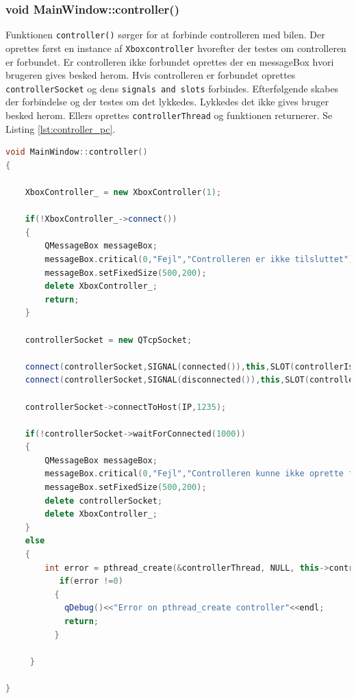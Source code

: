 \subsubsection{void MainWindow::controller()}
Funktionen \texttt{controller()} sørger for at forbinde controlleren med bilen. Der oprettes først en instance af \texttt{Xboxcontroller} hvorefter der testes om controlleren er forbundet. Er controlleren ikke forbundet oprettes der en messageBox hvori brugeren gives besked herom. Hvis controlleren er forbundet oprettes \texttt{controllerSocket} og dens \texttt{signals and slots} forbindes. Efterfølgende skabes der forbindelse og der testes om det lykkedes. Lykkedes det ikke gives bruger besked herom. Ellers oprettes \texttt{controllerThread} og funktionen returnerer. Se Listing \ref{lst:controller_pc}.
\begin{lstlisting}[caption={controller},label=lst:controller_pc, language=c++]
void MainWindow::controller()
{

    XboxController_ = new XboxController(1);

    if(!XboxController_->connect())
    {
        QMessageBox messageBox;
        messageBox.critical(0,"Fejl","Controlleren er ikke tilsluttet");
        messageBox.setFixedSize(500,200);
        delete XboxController_;
        return;
    }

    controllerSocket = new QTcpSocket;

    connect(controllerSocket,SIGNAL(connected()),this,SLOT(controllerIsConnected()),Qt::AutoConnection);
    connect(controllerSocket,SIGNAL(disconnected()),this,SLOT(controllerLostConnection()),Qt::AutoConnection);

    controllerSocket->connectToHost(IP,1235);

    if(!controllerSocket->waitForConnected(1000))
    {
        QMessageBox messageBox;
        messageBox.critical(0,"Fejl","Controlleren kunne ikke oprette forbindelse til bilen");
        messageBox.setFixedSize(500,200);
        delete controllerSocket;
        delete XboxController_;
    }
    else
    {
        int error = pthread_create(&controllerThread, NULL, this->controllerStreamHelper ,this);
           if(error !=0)
          {
            qDebug()<<"Error on pthread_create controller"<<endl;
            return;
          }

     }

}
\end{lstlisting}
